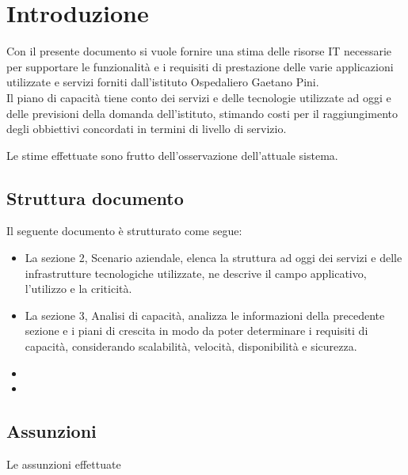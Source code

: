 \newpage

\section{Introduzione}
	Con il presente documento si vuole fornire una stima delle risorse IT necessarie per supportare le funzionalità e i requisiti di prestazione delle varie applicazioni utilizzate e servizi forniti dall'istituto  Ospedaliero Gaetano Pini.\\
	Il piano di capacità tiene conto dei servizi e delle tecnologie utilizzate ad oggi e delle previsioni della domanda dell'istituto, stimando costi per il raggiungimento degli obbiettivi concordati in termini di livello di servizio.
	
	Le stime effettuate sono frutto dell'osservazione dell'attuale sistema.
	\subsection{Struttura documento}
	Il seguente documento è strutturato come segue:
	\begin{itemize}
		\item La sezione 2, Scenario aziendale, elenca la struttura ad oggi dei servizi e delle infrastrutture tecnologiche utilizzate, ne descrive il campo applicativo, l'utilizzo e la criticità.
		\item La sezione 3, Analisi di capacità, analizza le informazioni della precedente sezione e i piani di crescita in modo da poter determinare i requisiti di capacità, considerando scalabilità, velocità, disponibilità e sicurezza.
		\item 
		\item
	\end{itemize}
	
	\subsection{Assunzioni}
	Le assunzioni effettuate 